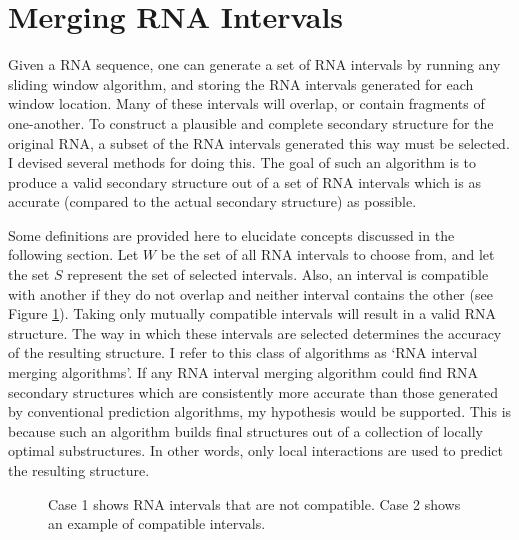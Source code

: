 \documentclass{cshonours}
\begin{document}
\section{Merging RNA Intervals}
\label{sec:merging}

Given a RNA sequence, one can generate a set of RNA intervals by running any sliding window algorithm, and storing the RNA intervals generated for each window location. Many of these intervals will overlap, or contain fragments of one-another. To construct a plausible and complete secondary structure for the original RNA, a subset of the RNA intervals generated this way must be selected. I devised several methods for doing this. The goal of such an algorithm is to produce a valid secondary structure out of a set of RNA intervals which is as accurate (compared to the actual secondary structure) as possible.


Some definitions are provided here to elucidate concepts discussed in the following section. Let $W$ be the set of all RNA intervals to choose from, and let the set $S$ represent the set of selected intervals. Also, an interval is compatible with another if they do not overlap and neither interval contains the other (see Figure \ref{fig:compatible}). Taking only mutually compatible intervals will result in a valid RNA  structure. The way in which these intervals are selected determines the accuracy of the resulting structure. I refer to this class of algorithms as `RNA interval merging algorithms'. If any RNA interval merging algorithm could find RNA secondary structures which are consistently more accurate than those generated by conventional prediction algorithms, my hypothesis would be supported. This is because such an algorithm builds final structures out of a collection of locally optimal substructures. In other words, only local interactions are used to predict the resulting structure.

\begin{figure}
\begin{center}
\end{center}
\caption{Case 1 shows RNA intervals that are not compatible. Case 2 shows an example of compatible intervals.}
\label{fig:compatible}
\end{figure}
\end{document}
